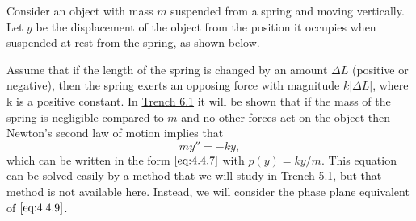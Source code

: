 \documentclass{ximera}
\begin{document}
 
 
\begin{example}\label{example:4.4.1}
 Consider an object with mass $m$ suspended from a
spring and moving vertically. Let $y$ be the displacement of the
object from the position it occupies when suspended at rest from the
spring, as shown below.

\begin{center}
\end{center}
 
 
Assume that if the length of the spring is changed by an amount
$\Delta L$ (positive or negative), then the spring exerts an opposing
force with magnitude $k|\Delta L|$, where k is a positive constant. In \href{https://xerxes.ximera.org/differentialequations/main/springProblemsI/springProblemsI}{Trench 6.1} it will be shown that if the mass of the spring
is negligible compared to $m$ and no other forces act on the object then
Newton's second law of motion implies that
\begin{equation}\label{eq:4.4.9}
my''=-ky,
\end{equation}
which can be written in the form $\eqref{eq:4.4.7}$ with $p(y)=ky/m$. This
equation can be solved easily by a method that we will study in
\href{https://xerxes.ximera.org/differentialequations/main/homogeneousLinearEquations/homogeneousLinearEquations}{Trench 5.1}, but that method is not available here. Instead,
we will consider the phase plane equivalent of $\eqref{eq:4.4.9}$.
 

\end{example}
\end{document}
